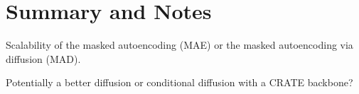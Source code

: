 \documentclass[../../book-main.tex]{subfiles}
\begin{document}
\section{Summary and Notes}
Scalability of the masked autoencoding (MAE) or the masked
autoencoding via diffusion (MAD).

Potentially a better diffusion or conditional diffusion  with a CRATE backbone?


\end{document}
